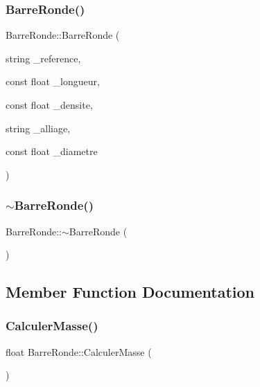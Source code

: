 \subsubsection{\texorpdfstring{Barre\+Ronde()}{BarreRonde()}}
{\footnotesize\ttfamily Barre\+Ronde\+::\+Barre\+Ronde (\begin{DoxyParamCaption}\item[{string}]{\+\_\+reference,  }\item[{const float}]{\+\_\+longueur,  }\item[{const float}]{\+\_\+densite,  }\item[{string}]{\+\_\+alliage,  }\item[{const float}]{\+\_\+diametre }\end{DoxyParamCaption})}

\mbox{\label{class_barre_ronde_aa62c3c350d2153aefcab64a20a6a795a}} 
\subsubsection{\texorpdfstring{$\sim$\+Barre\+Ronde()}{~BarreRonde()}}
{\footnotesize\ttfamily Barre\+Ronde\+::$\sim$\+Barre\+Ronde (\begin{DoxyParamCaption}{ }\end{DoxyParamCaption})}



\subsection{Member Function Documentation}
\mbox{\label{class_barre_ronde_a450c58e2bfcb1300339f1c790740e5ad}} 
\subsubsection{\texorpdfstring{Calculer\+Masse()}{CalculerMasse()}}
{\footnotesize\ttfamily float Barre\+Ronde\+::\+Calculer\+Masse (\begin{DoxyParamCaption}{ }\end{DoxyParamCaption})}

\mbox{\label{class_barre_ronde_aa405f0463a7681f80a66da91c1d310a9}} 
